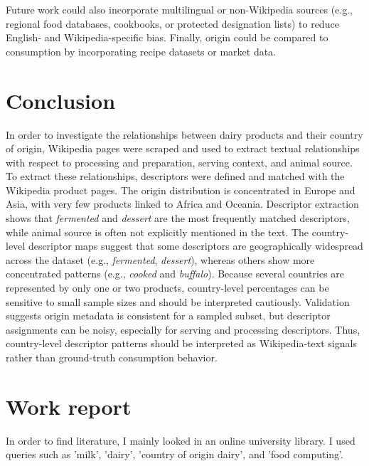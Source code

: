 \documentclass[sigconf]{acmart-txmm}
\begin{document}
Future work could also incorporate multilingual or non-Wikipedia sources (e.g., regional food databases, cookbooks, or protected designation lists) to reduce English- and Wikipedia-specific bias. 
Finally, origin could be compared to consumption by incorporating recipe datasets or market data. 

\section{Conclusion}
In order to investigate the relationships between dairy products and their country of origin, Wikipedia pages were scraped and used to extract textual relationships with respect to processing and preparation, serving context, and animal source. 
To extract these relationships, descriptors were defined and matched with the Wikipedia product pages. 
The origin distribution is concentrated in Europe and Asia, with very few products linked to Africa and Oceania.
Descriptor extraction shows that \emph{fermented} and \emph{dessert} are the most frequently matched descriptors, while animal source is often not explicitly mentioned in the text.
The country-level descriptor maps suggest that some descriptors are geographically widespread across the dataset (e.g., \emph{fermented}, \emph{dessert}), whereas others show more concentrated patterns (e.g., \emph{cooked} and \emph{buffalo}).
Because several countries are represented by only one or two products, country-level percentages can be sensitive to small sample sizes and should be interpreted cautiously.
Validation suggests origin metadata is consistent for a sampled subset, but descriptor assignments can be noisy, especially for serving and processing descriptors.
Thus, country-level descriptor patterns should be interpreted as Wikipedia-text signals rather than ground-truth consumption behavior.


\newpage

\def\bibfont{\small} %
 

\newpage
\appendix
\section{Work report}
In order to find literature, I mainly looked in an online university library.
I used queries such as 'milk', 'dairy', 'country of origin dairy', and 'food computing'.
\end{document}
